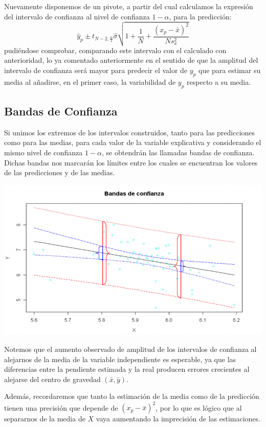 \documentclass[10pt,a4paper]{book}
\begin{document}
Nuevamente disponemos de un pivote, a partir del cual calculamos la expresión del intervalo de confianza al nivel de confianza $1-\alpha$, para la predicción:
$$\widehat{y}_p\pm t_{N-2,\frac{\alpha}{2}}\widehat{\sigma}\sqrt{1+\dfrac{1}{N}+\dfrac{(x_p-\bar{x})^2}{Ns^2_x}}$$
pudiéndose comprobar, comparando este intervalo con el calculado con anterioridad, lo ya comentado anteriormente en el sentido de que la amplitud del intervalo de confianza será mayor para predecir el valor de $y_p$ que para estimar su media al añadirse, en el primer caso, la variabilidad de $y_p$ respecto a su media.
		\subsection{Bandas de Confianza}
Si unimos los extremos de los intervalos construidos, tanto para las predicciones como para las medias, para cada valor de la variable explicativa y considerando el mismo nivel de confianza $1-\alpha$, se obtendrán las llamadas bandas de confianza. Dichas bandas nos marcarán los límites entre los cuales se encuentran los valores de las predicciones y de las medias.

\begin{center}
\includegraphics[scale=.6]{imagenes/tema3_4-3.png} 
\end{center}

Notemos que el aumento observado de amplitud de los intervalos de confianza al alejarnos de la media de la variable independiente es esperable, ya que las diferencias entre la pendiente estimada y la real producen errores crecientes al alejarse del centro de gravedad $(\bar{x},\bar{y})$.

Además, recordaremos que tanto la estimación de la media como de la predicción tienen una precisión que depende de $(x_p-\bar{x})^2$, por lo que es lógico que al separarnos de la media de $X$ vaya aumentando la imprecisión de las estimaciones.
\end{document}
